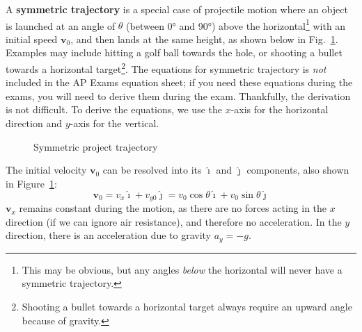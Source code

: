 \documentclass[11pt]{article}
\newcommand{\mb}[1]{\mathbf{#1}}
\newcommand{\iii}{\bm{\hat{\imath}}}
\newcommand{\jjj}{\bm{\hat{\jmath}}}
\begin{document}
\begin{center}
\end{center}

A \textbf{symmetric trajectory} is a special case of projectile motion where an
object is launched at an angle of $\theta$ (between \ang{0} and \ang{90}) above
the horizontal\footnote{This may be obvious, but any angles \emph{below} the 
  horizontal will never have a symmetric trajectory.} with an initial speed
$\mb{v}_0$, and then lands at the same height, as shown below in Fig.~\ref{sym}.
Examples may include hitting a golf ball towards the hole, or shooting a bullet
towards a horizontal target\footnote{Shooting a bullet towards a horizontal
  target always require an upward angle because of gravity.}. The equations for
symmetric trajectory is \emph{not} included in the AP Exams equation sheet; if
you need these equations during the exams, you will need to derive them during
the exam. Thankfully, the derivation is not difficult. To derive the equations,
we use the $x$-axis for the horizontal direction and $y$-axis for the vertical.
\begin{figure}[ht]
  \begin{center}
  \end{center}
  \vspace{-.2in}
  \caption{Symmetric project trajectory}
  \label{sym}
\end{figure}

The initial velocity $\mb{v}_0$ can be resolved into its $\iii$ and $\jjj$
components, also shown in Figure~\ref{sym}:
\begin{equation}
  \mb{v}_0
  =v_x\iii+v_{y0}\jjj
  =v_0\cos\theta\iii + v_0\sin\theta\jjj
\end{equation}
$\mb{v}_x$ remains constant during the motion, as there are no forces acting in
the $x$ direction (if we can ignore air resistance), and therefore no
acceleration. In the $y$ direction, there is an acceleration due to gravity
$a_y=-g$.
\end{document}

